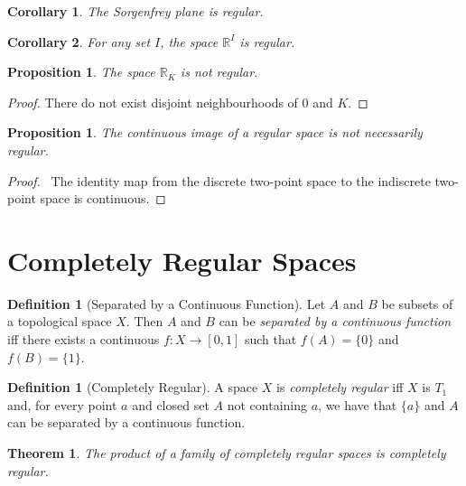 \documentclass{report}
\let\qed\relax
\newtheorem{prop}[lm]{Proposition}
\newtheorem{thm}[lm]{Theorem}
\newtheorem{cor}{Corollary}[lm]
\theoremstyle{definition}
\newtheorem{df}[lm]{Definition}
\begin{document}
 \begin{cor}
  The Sorgenfrey plane is regular.
 \end{cor}

 \begin{cor}
   For any set $I$, the space $\mathbb{R}^I$ is regular.
 \end{cor}

 \begin{prop}
  The space $\mathbb{R}_K$ is not regular.
\end{prop}

\begin{proof}
 \pf There do not exist disjoint neighbourhoods of 0 and $K$. \qed
\end{proof}

\begin{prop}
  The continuous image of a regular space is not necessarily regular.
\end{prop}

\begin{proof}
  \pf\ The identity map from the discrete two-point space to the indiscrete two-point space is continuous. \qed
\end{proof}

 \section{Completely Regular Spaces}

   \begin{df}[Separated by a Continuous Function]
   Let $A$ and $B$ be subsets of a topological space $X$. Then $A$ and $B$ can
   be \emph{separated by a continuous function} iff there exists a continuous
   $f : X \rightarrow [0,1]$ such that $f(A) = \{ 0 \}$ and $f(B) = \{ 1 \}$.
  \end{df}

    \begin{df}[Completely Regular]
    A space $X$ is \emph{completely regular} iff $X$ is $T_1$ and, for every
    point $a$ and closed set $A$ not containing $a$, we have that $\{a\}$ and
    $A$ can be separated by a continuous function.
  \end{df}

   \begin{thm}
     \label{thm:topology:completely_regular:product}
  The product of a family of completely regular spaces is completely regular.
 \end{thm}
\end{document}

